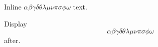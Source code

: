 \documentclass[12pt]{article}
\begin{document}
Inline $\alpha \beta \gamma \delta \theta \lambda \mu \nu \pi \sigma \phi \omega$ text.

Display \[ \alpha \beta \gamma \delta \theta \lambda \mu \nu \pi \sigma \phi \omega \] after.
\end{document}
